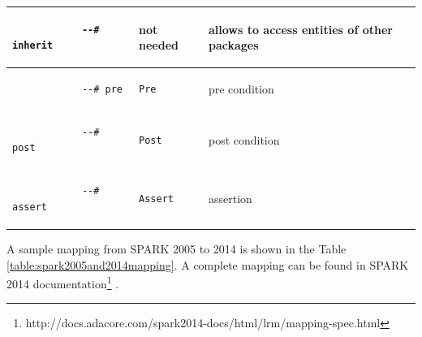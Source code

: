 \begin{center}
\begin{longtable}{| p{1.5in} | p{1.5in} | p{3in} |}
		\\ \hline

		\begin{lstlisting}
			--# inherit
		\end{lstlisting} 
		& 
		not needed
		& 
		allows to access entities of other packages

		\\ \hline

		\begin{lstlisting}
			--# pre
		\end{lstlisting} 
		& 
		\begin{lstlisting}[language=ada2012]
			Pre
		\end{lstlisting} 
		& 
		pre condition

		\\ \hline
		

		\begin{lstlisting}
			--# post
		\end{lstlisting} 
		& 
		\begin{lstlisting}[language=ada2012]
			Post
		\end{lstlisting} 
		& 
		post condition

		\\ \hline
		

		\begin{lstlisting}
			--# assert
		\end{lstlisting} 
		& 
		\begin{lstlisting}[language=ada2012]
			Assert
		\end{lstlisting} 
		& 
		assertion

		\\ \hline
	\end{longtable}
\end{center}
\doublespacing

A sample mapping from SPARK 2005 to 2014 is shown in the Table \ref{table:spark2005and2014mapping}. A complete mapping can be found in SPARK 2014 documentation\footnote{http://docs.adacore.com/spark2014-docs/html/lrm/mapping-spec.html} \cite{Spark2014refManual:Online}.

